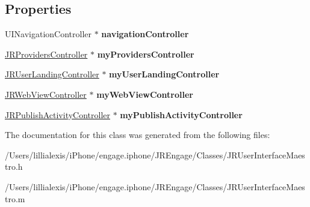\subsection*{Properties}
\begin{DoxyCompactItemize}
\item 
\hypertarget{interface_j_r_user_interface_maestro_a523aa7429d181a6ab4df416e6082d97a}{
UINavigationController $\ast$ {\bfseries navigationController}}
\label{interface_j_r_user_interface_maestro_a523aa7429d181a6ab4df416e6082d97a}

\item 
\hypertarget{interface_j_r_user_interface_maestro_ae78129ad4f2ed789c6dc0473e68a921f}{
\hyperlink{interface_j_r_providers_controller}{JRProvidersController} $\ast$ {\bfseries myProvidersController}}
\label{interface_j_r_user_interface_maestro_ae78129ad4f2ed789c6dc0473e68a921f}

\item 
\hypertarget{interface_j_r_user_interface_maestro_ace96364d0560a4f775c4b2074a2a579e}{
\hyperlink{interface_j_r_user_landing_controller}{JRUserLandingController} $\ast$ {\bfseries myUserLandingController}}
\label{interface_j_r_user_interface_maestro_ace96364d0560a4f775c4b2074a2a579e}

\item 
\hypertarget{interface_j_r_user_interface_maestro_a116866cc5e74805190ce9179fb48b0bd}{
\hyperlink{interface_j_r_web_view_controller}{JRWebViewController} $\ast$ {\bfseries myWebViewController}}
\label{interface_j_r_user_interface_maestro_a116866cc5e74805190ce9179fb48b0bd}

\item 
\hypertarget{interface_j_r_user_interface_maestro_aaa50faf07c8bff71621c5666b7f5b191}{
\hyperlink{interface_j_r_publish_activity_controller}{JRPublishActivityController} $\ast$ {\bfseries myPublishActivityController}}
\label{interface_j_r_user_interface_maestro_aaa50faf07c8bff71621c5666b7f5b191}

\end{DoxyCompactItemize}


The documentation for this class was generated from the following files:\begin{DoxyCompactItemize}
\item 
/Users/lillialexis/iPhone/engage.iphone/JREngage/Classes/JRUserInterfaceMaestro.h\item 
/Users/lillialexis/iPhone/engage.iphone/JREngage/Classes/JRUserInterfaceMaestro.m\end{DoxyCompactItemize}
